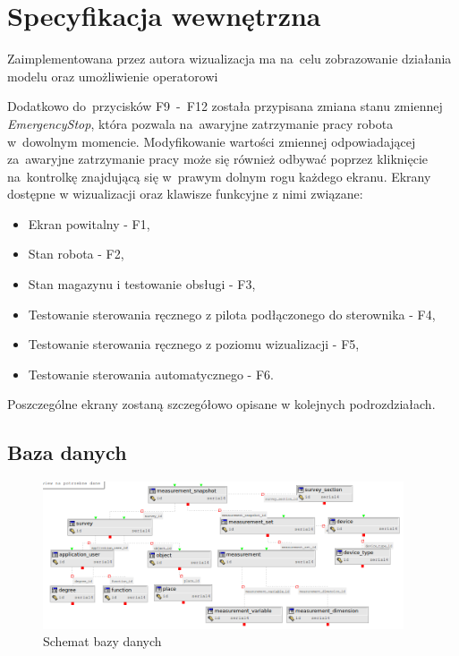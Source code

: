 \section{Specyfikacja wewnętrzna}
Zaimplementowana przez autora wizualizacja ma na~celu zobrazowanie działania modelu oraz umożliwienie operatorowi 

Dodatkowo do~przycisków F9~-~F12 została przypisana zmiana stanu zmiennej \emph{EmergencyStop}, która pozwala na~awaryjne zatrzymanie pracy robota w~dowolnym momencie. Modyfikowanie wartości zmiennej odpowiadającej za~awaryjne zatrzymanie pracy może się również odbywać poprzez kliknięcie na~kontrolkę znajdującą się w~prawym dolnym rogu każdego ekranu.
Ekrany dostępne w wizualizacji oraz klawisze funkcyjne z nimi związane:
\begin{itemize} 
\item Ekran powitalny - F1,
\item Stan robota - F2,
\item Stan magazynu i testowanie obsługi - F3,
\item Testowanie sterowania ręcznego z pilota podłączonego do sterownika - F4,
\item Testowanie sterowania ręcznego z poziomu wizualizacji - F5,
\item Testowanie sterowania automatycznego - F6.
\end{itemize}
\indent
\indent Poszczególne ekrany zostaną szczegółowo opisane w kolejnych podrozdziałach.
\subsection{Baza danych}

\begin{figure}[!htb] 	
\centering 	
\includegraphics[width=0.95\textwidth]{images/database} 
\caption{Schemat bazy danych} 
\label{template}
 \end{figure}